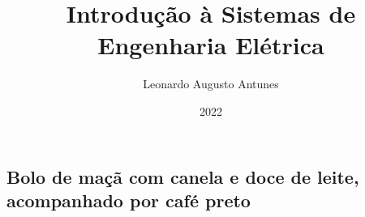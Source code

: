 \documentclass{ReportNew}
\author{Leonardo Augusto Antunes}
\title{Introdução à Sistemas de Engenharia Elétrica}
\date{2022}
\begin{document}
    \cover
    \contents
    \begin{refsection}
        \printbibliography[heading=subbibliography]
    \end{refsection}
    \begin{refsection}
        \chapter{Bolo de maçã com canela e doce de leite, acompanhado por café preto}
        \cite{weber2010internet}
        \printbibliography[heading=subbibliography]
    \end{refsection}
\end{document}
